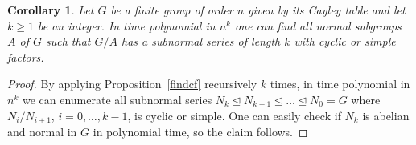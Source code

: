 \documentclass[10pt,a4paper]{amsart}
\newtheorem{corollary}{Corollary}
\begin{document}
\begin{corollary}\label{findall}
	Let \( G \) be a finite group of order \( n \) given by its Cayley table and let \( k \geq 1 \) be an integer.
	In time polynomial in \( n^k \) one can find all normal subgroups \( A \) of \( G \) such that \( G/A \) has a subnormal series of length \( k \) with
	cyclic or simple factors.
\end{corollary}

\begin{proof}
	By applying Proposition~\ref{findcf} recursively \( k \) times, in time polynomial in \( n^k \)
	we can enumerate all subnormal series \( N_k \unlhd N_{k-1} \unlhd \dots \unlhd N_0 = G \) where \( N_i/N_{i+1} \), \( i = 0, \dots, k-1 \), is cyclic or simple. 
	One can easily check if \( N_k \) is abelian and normal in \( G \) in polynomial time, so the claim follows.
\end{proof}
\end{document}
